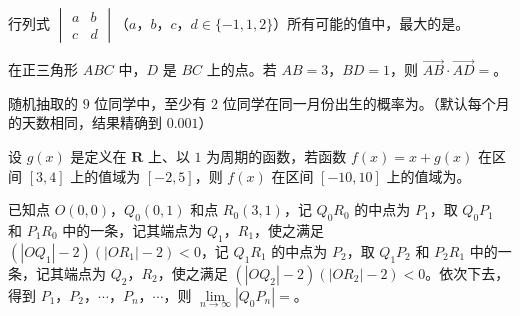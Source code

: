 \begin{question}
行列式 $\begin{vmatrix}a&b\\ c&d\end{vmatrix}$（$a$，$b$，$c$，$d\in\{-1,1,2\}$）所有可能的值中，最大的是\gkblank{}。

\end{question}
\begin{question}
在正三角形 $ABC$ 中，$D$ 是 $BC$ 上的点。若 $AB=3$，$BD=1$，则 $\overrightarrow{AB}\cdot\overrightarrow{AD}=$\gkblank{}。

\end{question}
\begin{question}
随机抽取的 $9$ 位同学中，至少有 $2$ 位同学在同一月份出生的概率为\gkblank{}。（默认每个月的天数相同，结果精确到 $0.001$）

\end{question}
\begin{question}
设 $g(x)$ 是定义在 $\mathbf R$ 上、以 $1$ 为周期的函数，若函数 $f(x)=x+g(x)$ 在区间 $[3,4]$ 上的值域为 $[-2,5]$，则 $f(x)$ 在区间 $[-10,10]$ 上的值域为\gkblank{}。

\end{question}
\begin{question}
已知点 $O(0,0)$，$Q_0(0,1)$ 和点 $R_0(3,1)$，记 $Q_0R_0$ 的中点为 $P_1$，取 $Q_0P_1$ 和 $P_1R_0$ 中的一条，记其端点为 $Q_1$，$R_1$，使之满足 $(|OQ_1|-2)(|OR_1|-2)<0$，记 $Q_1R_1$ 的中点为 $P_2$，取 $Q_1P_2$ 和 $P_2R_1$ 中的一条，记其端点为 $Q_2$，$R_2$，使之满足 $(|OQ_2|-2)(|OR_2|-2)<0$。依次下去，得到 $P_1$，$P_2$，$\cdots$，$P_n$，$\cdots$，则 $\lim\limits_{n\to\infty}|Q_0P_n|=$\gkblank{}。

\end{question}

